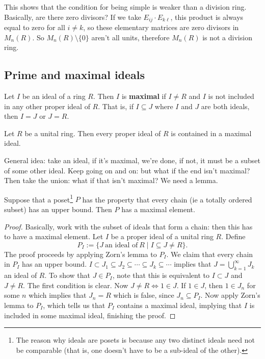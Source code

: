 \begin{remark}
    This shows that the condition for being simple is weaker than a division ring. Basically, are there zero divisors? If we take $E_{ij}\cdot E_{k\ell}$, this product is always equal to zero for all $i\neq k$, so these elementary matrices are zero divisors in $M_n (R)$. So $M_n (R) \setminus \{0\} $ aren't all units, therefore $M_n (R)$ is not a division ring.
\end{remark}
\subsection{Prime and maximal ideals}
\begin{definition}
    Let $I$ be an ideal of a ring $R.$ Then $I$ is \textbf{maximal} if $I\neq R$ and $I$ is not included in any other proper ideal of $R$. That is, if $I\subseteq J$ where $I$ and $J$ are both ideals, then $I=J$ or $J=R$.
\end{definition}
\begin{prop}
    Let $R$ be a unital ring. Then every proper ideal of $R$ is contained in a maximal ideal.
\end{prop}
General idea: take an ideal, if it's maximal, we're done, if not, it must be a subset of some other ideal. Keep going on and on: but what if the end isn't maximal? Then take the union: what if that isn't maximal? We need a lemma. 
\begin{lemma}\label{zorn}
    Suppose that a poset\footnote{The reason why ideals are posets is because any two distinct ideals need not be comparable (that is, one doesn't have to be a sub-ideal of the other).} $P$ has the property that every chain (ie a totally ordered subset) has an upper bound. Then $P$ has a maximal element.
\end{lemma}
\begin{proof}
Basically, work with the subset of ideals that form a chain: then this has to have a maximal element. Let $I$ be a proper ideal of a unital ring $R$. Define \[
    P_I := \{J \ \text{an ideal of} \ R  \mid I\subseteq J\neq R\}.
\] The proof proceeds by applying Zorn's lemma to $P_I$. We claim that every chain in $P_I$ has an upper bound. $I\subset J_1\subseteq J_2\subseteq \cdots \subseteq J_k\subseteq \cdots $ implies that $J=\bigcup_{k=1}^{\infty}J_k$ an ideal of $R$. To show that $J\in P_I$, note that this is equivalent to $I\subset J$ and $J\neq R$. The first condition is clear. Now $J\neq R \iff 1\in J$. If $1\in J$, then $1\in J_n $ for some $n$ which implies that $J_n =R$ which is false, since $J_n \subseteq P_I$. Now apply Zorn's lemma to $P_I$, which tells us that $P_I$ contains a maximal ideal, implying that $I$ is included in some maximal ideal, finishing the proof.
\end{proof}

